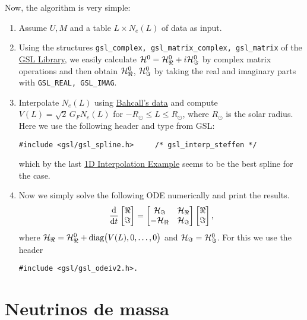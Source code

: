\documentclass[a4paper,fleqn,12pt]{article}
\begin{document}
Now, the algorithm is very simple:
\begin{enumerate}

\item Assume $U, M$ and a table $L \times N_e(L)$ of data as input.

\item Using the structures \texttt{gsl_complex, gsl_matrix_complex, gsl_matrix}
of the \href{https://www.gnu.org/software/gsl/doc/html/}{GSL Library},
we easily calculate $\H^0 = \H^0_\real + i\H^0_\imaginary$ by complex matrix operations and then obtain $\H^0_\real$, $\H^0_\imaginary$ by taking the real and imaginary parts with \texttt{GSL_REAL, GSL_IMAG}.

\item Interpolate $N_e(L)$ using \href{http://www.sns.ias.edu/~jnb/SNdata/sndata.html}{Bahcall's data} and compute $V(L) = \sqrt{2} \, G_F N_e(L)$ for $-R_\odot \leq L \leq R_\odot$, where $R_\odot$ is the solar radius. Here we use the following header and type from GSL:
\begin{verbatim}
#include <gsl/gsl_spline.h>     /* gsl_interp_steffen */
\end{verbatim}
which by the last \href{https://www.gnu.org/software/gsl/doc/html/interp.html#d-interpolation-example-programs}{1D Interpolation Example} seems to be the best spline for the case.

\item Now we simply solve the following ODE numerically and print the results.
$$
\dv{}{t}
\begin{bmatrix}
\real \\ \imaginary
\end{bmatrix}
=
\begin{bmatrix}
\H_\imaginary & \H_\real \\
-\H_\real & \H_\imaginary
\end{bmatrix}
\begin{bmatrix}
\real \\ \imaginary
\end{bmatrix},
$$
where $\H_\real = \H^0_\real + \text{diag}\big(V(L), 0, \ldots, 0\big)$ and $\H_\imaginary = \H^0_\imaginary$. For this we use the header
\begin{verbatim}
#include <gsl/gsl_odeiv2.h>.
\end{verbatim}

\end{enumerate}

\section{Neutrinos de massa}
\end{document}
